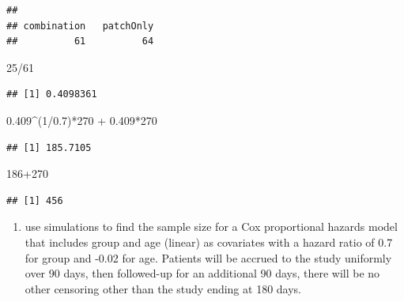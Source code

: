 \documentclass[
]{article}
\newenvironment{Shaded}{\begin{snugshade}}{\end{snugshade}}
\newcommand{\DecValTok}[1]{\textcolor[rgb]{0.00,0.00,0.81}{#1}}
\newcommand{\FloatTok}[1]{\textcolor[rgb]{0.00,0.00,0.81}{#1}}
\newcommand{\FunctionTok}[1]{\textcolor[rgb]{0.00,0.00,0.00}{#1}}
\newcommand{\NormalTok}[1]{#1}
\newcommand{\SpecialCharTok}[1]{\textcolor[rgb]{0.00,0.00,0.00}{#1}}
\providecommand{\tightlist}{%
  \setlength{\itemsep}{0pt}\setlength{\parskip}{0pt}}
\begin{document}
\begin{Shaded}
\end{Shaded}

\begin{verbatim}
## 
## combination   patchOnly 
##          61          64
\end{verbatim}

\begin{Shaded}
\begin{Highlighting}[]
\DecValTok{25}\SpecialCharTok{/}\DecValTok{61}
\end{Highlighting}
\end{Shaded}

\begin{verbatim}
## [1] 0.4098361
\end{verbatim}

\begin{Shaded}
\begin{Highlighting}[]
\FloatTok{0.409}\SpecialCharTok{\^{}}\NormalTok{(}\DecValTok{1}\SpecialCharTok{/}\FloatTok{0.7}\NormalTok{)}\SpecialCharTok{*}\DecValTok{270} \SpecialCharTok{+} \FloatTok{0.409}\SpecialCharTok{*}\DecValTok{270}
\end{Highlighting}
\end{Shaded}

\begin{verbatim}
## [1] 185.7105
\end{verbatim}

\begin{Shaded}
\begin{Highlighting}[]
\DecValTok{186}\SpecialCharTok{+}\DecValTok{270}
\end{Highlighting}
\end{Shaded}

\begin{verbatim}
## [1] 456
\end{verbatim}

\begin{enumerate}
\def\labelenumi{\alph{enumi}.}
\setcounter{enumi}{1}
\tightlist
\item
  use simulations to find the sample size for a Cox proportional hazards
  model that includes group and age (linear) as covariates with a hazard
  ratio of 0.7 for group and -0.02 for age. Patients will be accrued to
  the study uniformly over 90 days, then followed-up for an additional
  90 days, there will be no other censoring other than the study ending
  at 180 days.
\end{enumerate}
\end{document}
